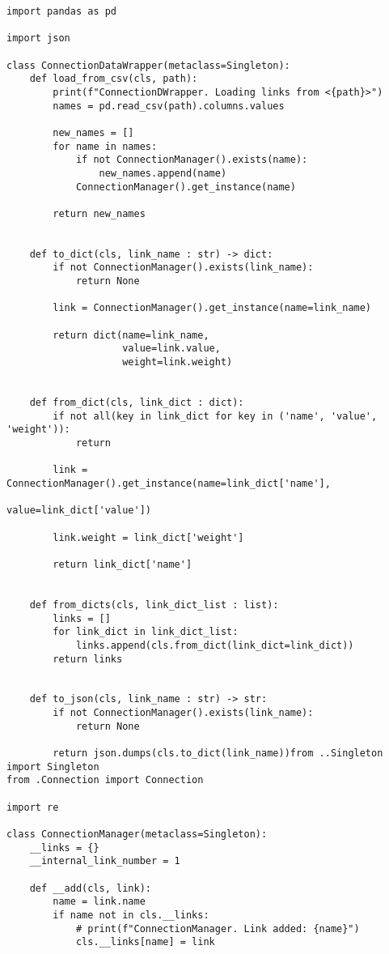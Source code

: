 \begin{verbatim}
import pandas as pd

import json

class ConnectionDataWrapper(metaclass=Singleton):
    def load_from_csv(cls, path):
        print(f"ConnectionDWrapper. Loading links from <{path}>")
        names = pd.read_csv(path).columns.values
        
        new_names = []
        for name in names:
            if not ConnectionManager().exists(name):
                new_names.append(name)
            ConnectionManager().get_instance(name)
            
        return new_names
    
    
    def to_dict(cls, link_name : str) -> dict:
        if not ConnectionManager().exists(link_name):
            return None
        
        link = ConnectionManager().get_instance(name=link_name)
        
        return dict(name=link_name, 
                    value=link.value,
                    weight=link.weight)
    
    
    def from_dict(cls, link_dict : dict):
        if not all(key in link_dict for key in ('name', 'value', 'weight')):
            return
        
        link = ConnectionManager().get_instance(name=link_dict['name'], 
                                                value=link_dict['value'])
        
        link.weight = link_dict['weight']
        
        return link_dict['name']
    
    
    def from_dicts(cls, link_dict_list : list):
        links = []
        for link_dict in link_dict_list:
            links.append(cls.from_dict(link_dict=link_dict))
        return links
    
    
    def to_json(cls, link_name : str) -> str:
        if not ConnectionManager().exists(link_name):
            return None
        
        return json.dumps(cls.to_dict(link_name))from ..Singleton import Singleton
from .Connection import Connection

import re

class ConnectionManager(metaclass=Singleton):
    __links = {}
    __internal_link_number = 1
    
    def __add(cls, link):
        name = link.name
        if name not in cls.__links:
            # print(f"ConnectionManager. Link added: {name}")
            cls.__links[name] = link
    

\end{verbatim}
